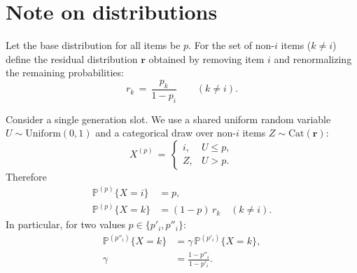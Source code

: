 \section{Note on distributions}
\label{app:note-on-distributions}

Let the base distribution for all items be $p$. For the set of non-$i$ items ($k\ne i$) define the residual distribution $\boldsymbol r$ obtained by removing item $i$ and renormalizing the remaining probabilities:
\begin{equation}
r_k \,=\, \frac{p_k}{1 - p_i} \qquad (k \ne i).
\end{equation}

Consider a single generation slot. We use a shared uniform random variable $U \sim \mathrm{Uniform}(0,1)$ and a categorical draw over non-$i$ items $Z \sim \mathrm{Cat}(\boldsymbol r)$:
\begin{equation}
X^{(p)} \,=\, \begin{cases}
 i, & U \le p, \\
 Z, & U > p.
\end{cases}
\end{equation}
Therefore
\begin{equation}
\begin{aligned}
\mathbb P^{(p)}\{X = i\} &= p, \\
\mathbb P^{(p)}\{X = k\} &= (1 - p)\, r_k \quad (k \ne i).
\end{aligned}
\end{equation}
In particular, for two values $p \in \{p'_i, p''_i\}$:
\begin{equation}
\begin{aligned}
\mathbb P^{(p''_i)}\{X = k\} &= \gamma\, \mathbb P^{(p'_i)}\{X = k\}, \\
\gamma &= \frac{1 - p''_i}{1 - p'_i}.
\end{aligned}
\end{equation}



